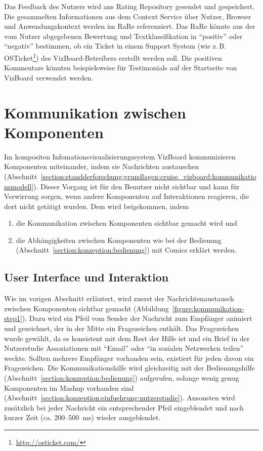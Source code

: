 \documentclass[
	headsepline,
	footsepline,
	fontsize=12pt,
	bibliography=totoc
]{scrbook}
\begin{document}

Das Feedback des Nutzers wird ans Rating Repository gesendet und gespeichert. Die gesammelten Informationen aus dem Context Service über Nutzer, Browser und Anwendungskontext werden im RaRe referenziert. Das RaRe könnte aus der vom Nutzer abgegebenen Bewertung und Textklassifikation \cite{Sebastiani2002} in \enquote{positiv} oder \enquote{negativ} bestimmen, ob ein Ticket in einem Support System (wie z.\,B. OSTicket\footnote{\url{http://osticket.com/}}) des VizBoard-Betreibers erstellt werden soll. Die positiven Kommentare könnten beispielsweise für Testimonials auf der Startseite von VizBoard verwendet werden.

\section{Kommunikation zwischen Komponenten}
\label{section:konzeption:kommunikation}

Im kompositen Infomationsvisualisierungssystem VizBoard kommunizieren Komponenten miteinander, indem sie Nachrichten austauschen (Abschnitt~\ref{section:standderforschung:grundlagen:cruise_vizboard:kommunikationsmodell}). Dieser Vorgang ist für den Benutzer nicht sichtbar und kann für Verwirrung sorgen, wenn andere Komponenten auf Interaktionen reagieren, die dort nicht getätigt wurden. Dem wird beigekommen, indem 

\begin{enumerate}
	\item die Kommunikation zwischen Komponenten sichtbar gemacht wird und
	\item die Abhängigkeiten zwischen Komponenten wie bei der Bedienung (Abschnitt~\ref{section:konzeption:bedienung}) mit Comics erklärt werden.
\end{enumerate}

\subsection{User Interface und Interaktion}
\label{section:konzeption:kommunikation:ui}

Wie im vorigen Abschnitt erläutert, wird zuerst der Nachrichtenaustausch zwischen Komponenten sichtbar gemacht (Abbildung~\ref{figure:kommunikation-step1}). Dazu wird ein Pfeil vom Sender der Nachricht zum Empfänger animiert und gezeichnet, der in der Mitte ein Fragezeichen enthält. Das Fragezeichen wurde gewählt, da es konsistent mit dem Rest der Hilfe ist und ein Brief in der Nutzerstudie Assoziationen mit \enquote{Email} oder \enquote{in sozialen Netzwerken teilen} weckte. Sollten mehrere Empfänger vorhanden sein, existiert für jeden davon ein Fragezeichen. Die Kommunikationshilfe wird gleichzeitig mit der Bedienungshilfe (Abschnitt~\ref{section:konzeption:bedienung}) aufgerufen, solange wenig genug Komponenten im Mashup vorhanden sind (Abschnitt~\ref{section:konzeption:einfuehrung:nutzerstudie}). Ansonsten wird zusätzlich bei jeder Nachricht ein entsprechender Pfeil eingeblendet und nach kurzer Zeit (ca. 200--500~ms) wieder ausgeblendet.
\end{document}
